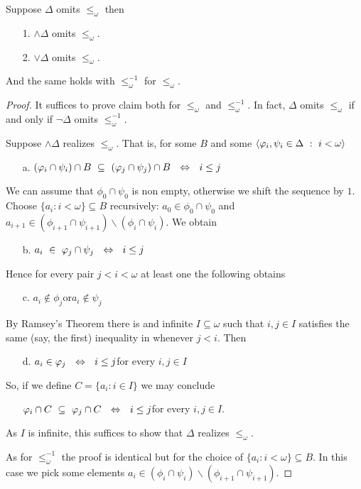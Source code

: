 \documentclass[creche.tex]{subfiles}
\begin{document}
\begin{lemma}\label{lem_ramsey} Suppose $\Delta$ omits $\le_\omega$ then 
\begin{itemize}
\item[1.] $\wedge\Delta$ omits $\le_\omega$.
\item[2.] $\vee\Delta$ omits $\le_\omega$.
\end{itemize}
And the same holds with $\le^{\scriptscriptstyle -1}_\omega$ for $\le_\omega$.
\end{lemma}
\begin{proof}
It suffices to prove claim  both for $\le_\omega$ and $\le^{\scriptscriptstyle -1}_\omega$.  In fact, $\Delta$ omits $\le_\omega$ if and only if $\neg\Delta$ omits $\le^{\scriptscriptstyle -1}_\omega$.

Suppose $\wedge\Delta$ realizes $\le_\omega$. That is, for some $B$ and some $\<\phi_i, \psi_i\in\Delta\ :\ i<\omega\>$
\begin{itemize}
\item[a.] $(\phi_i\cap\psi_i)\cap B\ \subseteq\ (\phi_j\cap\psi_j)\cap B\ \ \IFF\ \ i\le j$
\end{itemize}

We can assume that $\phi_0\cap\psi_0$ is non empty, otherwise we shift the sequence by $1$. Choose  $\big\{a_i:i<\omega\big\}\subseteq B$ recursively: $a_0\in \phi_0\cap\psi_0$ and $a_{i+1}\in  (\phi_{i+1}\cap\psi_{i+1})\smallsetminus(\phi_i\cap\psi_i)$. We obtain 

\begin{itemize}
\item[b.] $a_i\ \in\ \phi_j\cap\psi_j\ \ \IFF\ \ i\le j$
\end{itemize}

Hence for every pair $j<i<\omega$ at least one the following obtains

\begin{itemize}
\item[c.] $a_i\notin\phi_j$\qquad or\qquad $a_i\notin\psi_j$
\end{itemize}
By Ramsey's Theorem there is and infinite $I\subseteq\omega$ such that $i,j\in I$ satisfies the same (say, the first) inequality in  whenever $j<i$. Then 

\begin{itemize}
\item[d.] $a_i\in\varphi_j\ \ \Leftrightarrow\ \ i\le j$\qquad for every $i,j\in I$
\end{itemize}
So, if we define $C=\big\{a_i:i\in I\big\}$ we may conclude
\begin{itemize}
\item[]$\phi_i\cap C\ \subseteq\ \phi_j\cap C\ \ \IFF\ \ i\le j$\qquad for every $i,j\in I$.
\end{itemize}
As $I$ is infinite, this suffices to show that $\Delta$ realizes $\le_\omega$.

As for $\le^{\scriptscriptstyle -1}_\omega$ the proof is identical but for the choice of $\big\{a_i:i<\omega\big\}\subseteq B$. In this case we pick some elements  $a_i\in  (\phi_i\cap\psi_i)\smallsetminus(\phi_{i+1}\cap\psi_{i+1})$.
\end{proof}
\end{document}

